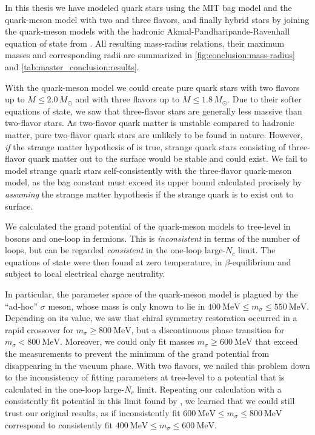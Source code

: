In this thesis we have modeled quark stars using the MIT bag model and the quark-meson model with two and three flavors,
and finally hybrid stars by joining the quark-meson models with the hadronic Akmal-Pandharipande-Ravenhall equation of state from \cite{ref:apr,ref:apr_data}.
All resulting mass-radius relations, their maximum masses and corresponding radii
are summarized in \cref{fig:conclusion:mass-radius} and \cref{tab:master_conclusion:results}.

With the quark-meson model we could create pure quark stars with two flavors up to $M \leq 2.0 \, M_\odot$ and with three flavors up to $M \leq 1.8 \, M_\odot$.
Due to their softer equations of state, we saw that three-flavor stars are generally less massive than two-flavor stars.
As two-flavor quark matter is unstable compared to hadronic matter,
pure two-flavor quark stars are unlikely to be found in nature.
However, \emph{if} the strange matter hypothesis of \cite{ref:strange_hypothesis_bodmer,ref:strange_hypothesis_witten} is true,
strange quark stars consisting of three-flavor quark matter out to the surface would be stable and could exist.
We fail to model strange quark stars self-consistently with the three-flavor quark-meson model,
as the bag constant must exceed its upper bound calculated precisely by \emph{assuming} the strange matter hypothesis if the strange quark is to exist out to surface.

We calculated the grand potential of the quark-meson models to tree-level in bosons and one-loop in fermions.
This is \emph{inconsistent} in terms of the number of loops, but can be regarded \emph{consistent} in the one-loop large-$N_c$ limit.
The equations of state were then found at zero temperature, in $\beta$-equilibrium and subject to local electrical charge neutrality.

In particular, the parameter space of the quark-meson model is plagued by the ``ad-hoc'' $\sigma$ meson,
whose mass is only known to lie in $\SI{400}{\mega\electronvolt} \leq m_\sigma \leq \SI{550}{\mega\electronvolt}$. \cite{ref:pdg_review_2021}
Depending on its value, we saw that chiral symmetry restoration occurred in a rapid crossover for $m_\sigma \geq \SI{800}{\mega\electronvolt}$,
but a discontinuous phase transition for $m_\sigma < \SI{800}{\mega\electronvolt}$.
Moreover, we could only fit masses $m_\sigma \geq \SI{600}{\mega\electronvolt}$ that exceed the measurements
to prevent the minimum of the grand potential from disappearing in the vacuum phase.
With two flavors,
we nailed this problem down to the inconsistency of fitting parameters at tree-level to a potential that is calculated in the one-loop large-$N_c$ limit.
Repeating our calculation with a consistently fit potential in this limit found by \cite{ref:jo_lsm_consistent_chiral,ref:jo_lsm_consistent_physical},
we learned that we could still trust our original results,
as if inconsistently fit $\SI{600}{\mega\electronvolt} \leq m_\sigma \leq \SI{800}{\mega\electronvolt}$
correspond to consistently fit $\SI{400}{\mega\electronvolt} \leq m_\sigma \leq \SI{600}{\mega\electronvolt}$.

